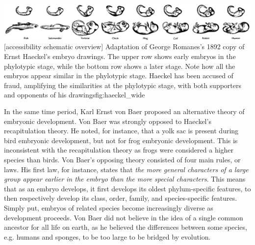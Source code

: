 {\includegraphics[width=2.2\textwidth]
{ch.introduction/imgs/haeckel_wide.png}}
[accessibility schematic overview]
{Adaptation of George Romanes's 1892 copy of Ernst Haeckel's embryo drawings. The upper row shows early embryos in the phylotypic stage, while the bottom row shows a later stage. Note how all the embryos appear similar in the phylotypic stage. Haeckel has been accused of fraud, amplifying the similarities at the phylotypic stage, with both supporters\cite{Richards2008} and opponents of his drawings\cite{Pennisi1997}}{fig:haeckel_wide}

In the same time period, Karl Ernst von Baer proposed an alternative theory of embryonic development. Von Baer was strongly opposed to Haeckel's recapitulation theory. He noted, for instance, that a yolk sac is present during bird embryonic development, but not for frog embryonic development. This is inconsistent with the recapitulation theory as frogs were considered a higher species than birds. Von Baer's opposing theory consisted of four main rules, or laws\cite{baer1828}. His first law, for instance, states that \textit{the more general characters of a large group appear earlier in the embryo than the more special characters}. This means that as an embryo develops, it first develops its oldest phylum-specific features, to then respectively develop its class, order, family, and species-specific features. Simply put, embryos of related species become increasingly diverse as development proceeds. Von Baer did not believe in the idea of a single common ancestor for all life on earth, as he believed the differences between some species, e.g. humans and sponges, to be too large to be bridged by evolution.

